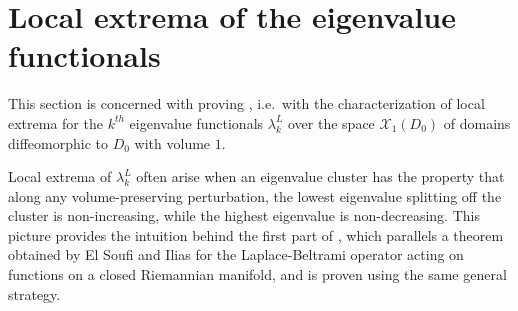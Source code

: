 \documentclass[11pt,reqno]{amsart}
\begin{document}
\section{Local extrema of the eigenvalue functionals}\label{section: critical points of the eigenvalue functionals}

This section is concerned with proving , i.e.\ with the characterization of local extrema for the $k^{th}$ eigenvalue functionals $\lambda_k^L$ over the space $\mathcal X_1(D_0)$ of domains diffeomorphic to $D_0$ with volume $1$.

Local extrema of $\lambda_k^L$ often arise when an eigenvalue cluster has the property that along any volume-preserving perturbation, the lowest eigenvalue splitting off the cluster is non-increasing, while the highest eigenvalue is non-decreasing. This picture provides the intuition behind the first part of , which parallels a theorem obtained by El Soufi and Ilias \cite{ElSoufiIllias2008} for the Laplace-Beltrami operator acting on functions on a closed Riemannian manifold, and is proven using the same general strategy.
\end{document}
